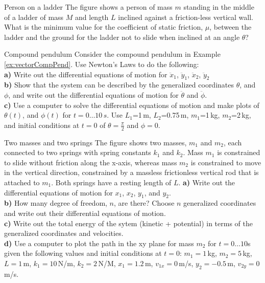 %
\begin{problem}{Person on a ladder}
\label{prob_Intro_5}
The figure shows a person of mass $m$ standing in the middle of a ladder of mass $M$ and length $L$ inclined against a friction-less vertical wall. What is the minimum value for the coefficient of static friction, $\mu$, between the ladder and the ground for the ladder not to slide when inclined at an angle $\theta$?
\end{problem}
%
\begin{problem}{Compound pendulum}
\label{prob_Intro_6}
Consider the compound pendulum in Example \ref{ex:vectorCompPend}. Use Newton's Laws to do the following:\\
\textbf{a)} Write out the differential equations of motion for $\ddot{x}_1$, $\ddot{y}_1$, $\ddot{x}_2$, $\ddot{y}_2$\\
\textbf{b)} Show that the system can be described by the generalized coordinates $\theta$, and $\phi$, and write out the differential equations of motion for $\ddot{\theta}$ and $\ddot{\phi}$.\\
\textbf{c)} Use a computer to solve the differential equations of motion and make plots of $\theta(t)$, and $\phi(t)$ for $t=0\dots 10\,s$. Use $L_1$=1\,m, $L_2$=0.75\,m, $m_1$=1\,kg, $m_2$=2\,kg, and initial conditions at $t=0$ of $\theta=\frac{\pi}{2}$ and $\phi=0$.
\end{problem}
%
\begin{problem}{Two masses and two springs}
\label{prob_Intro_7}
The figure shows two masses, $m_1$ and $m_2$, each connected to two springs with spring constants $k_1$ and $k_2$. Mass $m_1$ is constrained to slide without friction along the x-axis, whereas mass $m_2$ is constrained to move in the vertical direction, constrained by a massless frictionless vertical rod that is attached to $m_1$. Both springs have a resting length of $L$.
\textbf{a)} Write out the differential equations of motion for $x_1$, $x_2$, $y_1$, and $y_2$.\\
\textbf{b)} How many degree of freedom, $n$, are there? Choose $n$ generalized coordinates and write out their differential equations of motion.\\
\textbf{c)} Write out the total energy of the sytem (kinetic + potential) in terms of the generalized coordinates and velocities.\\
\textbf{d)} Use a computer to plot the path in the xy plane for mass $m_2$ for $t=0\dots 10$s given the following values and initial conditions at $t=0$: $m_1=1$\,kg, $m_2=5$\,kg, $L=1$\,m, $k_1=10$\,N/m, $k_2=2$\,N/M, $x_1=1.2$\,m, $v_{1x}=0$\,m/s, $y_2=-0.5$\,m, $v_{2y}=0$\,m/s.
\end{problem}
%

